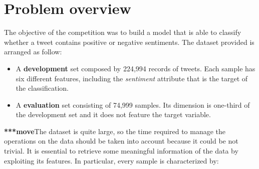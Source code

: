 \documentclass[conference]{IEEEtran}
\begin{document}
\section{Problem overview}\label{sec:overview}
The objective of the competition was to build a model that is able to classify whether a tweet contains positive or negative sentiments. The dataset provided is arranged as follow:
\begin{itemize}
    \item A \textbf{development} set composed by 224,994 records of tweets. Each sample has six different features, including the \textit{sentiment} attribute that is the target of the classification.
    \item A \textbf{evaluation} set consisting of 74,999 samples. Its dimension is one-third of the development set and it does not feature the target variable.
\end{itemize}
\textbf{***move}The dataset is quite large, so the time required to manage the operations on the data should be taken into account because it could be not trivial. It is essential to retrieve some meaningful information of the data by exploiting its features. In particular, every sample is characterized by:
\end{document}
